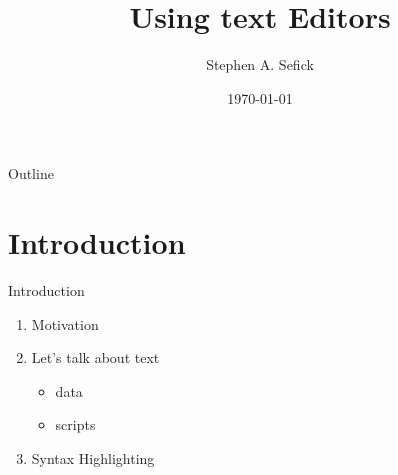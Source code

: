 \documentclass[t,10pt]{beamer}
\author{Stephen A. Sefick}
\date{\today}
\title{Using text Editors}
\begin{document}
\maketitle
\begin{frame}{Outline}
\tableofcontents
\end{frame}



\section{Introduction}
\label{sec:orgheadline4}
\begin{frame}[label={sec:orgheadline1}]{Introduction}
\begin{enumerate}[<+->]
\item Motivation
\item Let's talk about text
\begin{itemize}
\item data
\item scripts
\end{itemize}
\item Syntax Highlighting
\end{enumerate}
\end{frame}
\end{document}
